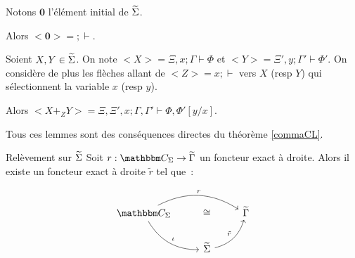 \begin{lem}
    Notons $\mathbf{0}$ l'élément initial de $\widetilde{\Sigma}$.
    
    Alors $<\mathbf{0}> = ;\vdash$.
\end{lem}

\begin{lem}
    Soient $X,Y\in\widetilde{\Sigma}$. On note $<X> = \Xi,x;\Gamma\vdash\Phi$ et
    $<Y> = \Xi',y;\Gamma'\vdash\Phi'$. On considère de plus les flèches allant de
    $<Z> = x;\vdash$ vers $X$ (resp $Y$) qui sélectionnent la variable $x$ (resp $y$).

    Alors $<X +_Z Y> = \Xi,\Xi',x;\Gamma,\Gamma'\vdash\Phi,\Phi'[y/x]$.
\end{lem}

\begin{pv}
    Tous ces lemmes sont des conséquences directes du théorème \ref{commaCL}.
\end{pv}

\begin{theo}{Relèvement sur $\widetilde{\Sigma}$}
    Soit $r : \C_\Sigma\rightarrow\tgamma$ un foncteur exact à droite. Alors il
    existe un foncteur exact à droite $\tilde{r}$ tel que~:

    \[\begin{tikzcd}
        \C_\Sigma\arrow[dr, bend right, "\iota"]\arrow[rr, bend left, "r"]
            & \cong & \tgamma \\
        & \tsigma\arrow[ur, bend right, "\tilde{r}"] & \\
    \end{tikzcd}\]
\end{theo}

